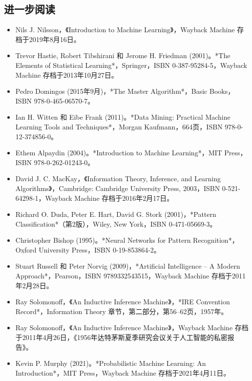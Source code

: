 \subsection{进一步阅读}  
\begin{itemize}
\item Nils J. Nilsson，《Introduction to Machine Learning》，Wayback Machine 存档于2019年8月16日。  
\item Trevor Hastie, Robert Tibshirani 和 Jerome H. Friedman (2001)。*The Elements of Statistical Learning*，Springer，ISBN 0-387-95284-5，Wayback Machine 存档于2013年10月27日。  
\item Pedro Domingos (2015年9月)，*The Master Algorithm*，Basic Books，ISBN 978-0-465-06570-7。  
\item Ian H. Witten 和 Eibe Frank (2011)。*Data Mining: Practical Machine Learning Tools and Techniques*，Morgan Kaufmann，664页，ISBN 978-0-12-374856-0。  
\item Ethem Alpaydin (2004)。*Introduction to Machine Learning*，MIT Press，ISBN 978-0-262-01243-0。  
\item David J. C. MacKay，《Information Theory, Inference, and Learning Algorithms》，Cambridge: Cambridge University Press, 2003，ISBN 0-521-64298-1，Wayback Machine 存档于2016年2月17日。  
\item Richard O. Duda, Peter E. Hart, David G. Stork (2001)，*Pattern Classification*（第2版），Wiley, New York，ISBN 0-471-05669-3。  
\item Christopher Bishop (1995)。*Neural Networks for Pattern Recognition*，Oxford University Press，ISBN 0-19-853864-2。  
\item Stuart Russell 和 Peter Norvig (2009)，*Artificial Intelligence – A Modern Approach*，Pearson，ISBN 9789332543515，Wayback Machine 存档于2011年2月28日。  
\item Ray Solomonoff，《An Inductive Inference Machine》，*IRE Convention Record*，Information Theory 章节，第二部分，第56–62页，1957年。  
\item Ray Solomonoff，《An Inductive Inference Machine》，Wayback Machine 存档于2011年4月26日，《1956年达特茅斯夏季研究会议关于人工智能的私密报告》。  
\item Kevin P. Murphy (2021)。*Probabilistic Machine Learning: An Introduction*，MIT Press，Wayback Machine 存档于2021年4月11日。
\end{itemize}